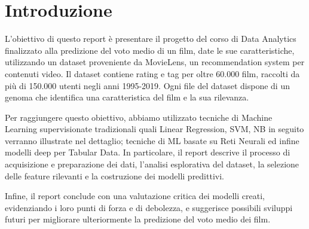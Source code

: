 \documentclass[../../Report.tex]{subfiles}
\begin{document}
\chapter{Introduzione}
L'obiettivo di questo report è presentare il progetto del corso di Data Analytics finalizzato alla predizione del voto medio di un film, date le sue caratteristiche, utilizzando un dataset proveniente da MovieLens, un recommendation system per contenuti video.
Il dataset contiene rating e tag per oltre 60.000 film, raccolti da più di 150.000 utenti negli anni 1995-2019. Ogni file del dataset dispone di un genoma che identifica una caratteristica del film e la sua rilevanza.

Per raggiungere questo obiettivo, abbiamo utilizzato tecniche di Machine Learning supervisionate tradizionali quali Linear Regression, SVM, NB in seguito verranno illustrate nel dettaglio; tecniche di ML basate su Reti Neurali ed infine modelli deep per Tabular Data.
In particolare, il report descrive il processo di acquisizione e preparazione dei dati, l'analisi esplorativa del dataset, la selezione delle feature rilevanti e la costruzione dei modelli predittivi.

Infine, il report conclude con una valutazione critica dei modelli creati, evidenziando i loro punti di forza e di debolezza, e suggerisce possibili sviluppi futuri per migliorare ulteriormente la predizione del voto medio dei film.
\end{document}
